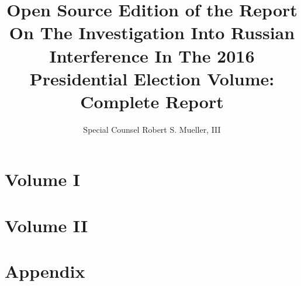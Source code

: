 \documentclass[12pt]{book}
\title{Open Source Edition of the Report On The Investigation Into Russian Interference In The 2016 Presidential Election Volume: Complete Report}
\author{Special Counsel Robert S. Mueller, III}
\begin{document}




\chapter{Volume I}















\chapter{Volume II}













\chapter{Appendix}








\end{document}
